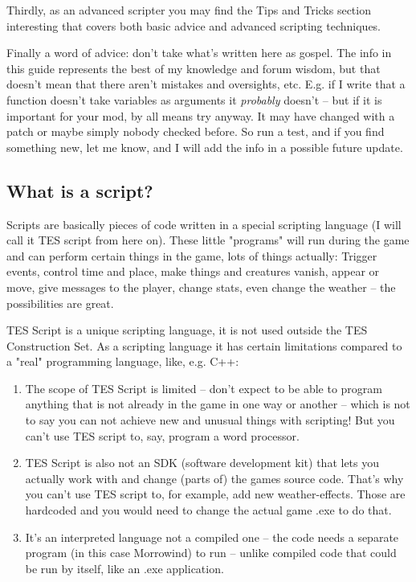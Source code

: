 \documentclass[oneside]{article}
\begin{document}
Thirdly, as an advanced scripter you may find the Tips and Tricks section interesting that covers both basic advice and advanced scripting techniques.

Finally a word of advice: don't take what's written here as gospel. The info in this guide represents the best of my knowledge and forum wisdom, but that doesn't mean that there aren't mistakes and oversights, etc. E.g. if I write that a function doesn't take variables as arguments it \emph{probably} doesn't -- but if it is important for your mod, by all means try anyway. It may have changed with a patch or maybe simply nobody checked before. So run a test, and if you find something new, let me know, and I will add the info in a possible future update.

\hypertarget{what-is-a-script}{%
\subsection{What is a script?}\label{what-is-a-script}}

Scripts are basically pieces of code written in a special scripting language (I will call it TES script from here on). These little "programs" will run during the game and can perform certain things in the game, lots of things actually: Trigger events, control time and place, make things and creatures vanish, appear or move, give messages to the player, change stats, even change the weather -- the possibilities are great.

TES Script is a unique scripting language, it is not used outside the TES Construction Set. As a scripting language it has certain limitations compared to a "real" programming language, like, e.g. C++:

\begin{enumerate}
\def\labelenumi{\arabic{enumi}.}
\item
  The scope of TES Script is limited -- don't expect to be able to program anything that is not already in the game in one way or another -- which is not to say you can not achieve new and unusual things with scripting! But you can't use TES script to, say, program a word processor.
\item
  TES Script is also not an SDK (software development kit) that lets you actually work with and change (parts of) the games source code. That's why you can't use TES script to, for example, add new weather-effects. Those are hardcoded and you would need to change the actual game .exe to do that.
\item
  It's an interpreted language not a compiled one -- the code needs a separate program (in this case Morrowind) to run -- unlike compiled code that could be run by itself, like an .exe application.
\end{enumerate}
\end{document}

